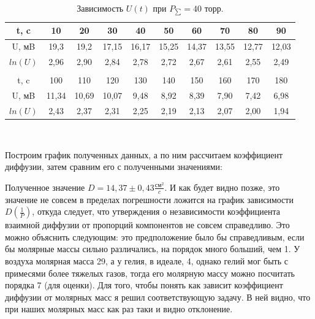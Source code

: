\documentclass[a4paper,11.5pt]{article} %
\begin{document}
\begin{table}[!h]
	\caption{Зависимость $U(t)$ при $P_{\sum} = 40 $ торр.}
\begin{tabular}{| c | c | c | c | c | c | c | c | c | c |}
\hline
t, c & 10 & 20 & 30 & 40 & 50 & 60 & 70 & 80 & 90  \\ \hline
U, мB & 19,3 & 19,2 & 17,15 & 16,17 & 15,25 & 14,37 & 13,55 & 12,77 & 12,03  \\ \hline
$ln(U)$ & 2,96 & 2,90 & 2,84 & 2,78 & 2,72 & 2,67 & 2,61 & 2,55 & 2,49  \\ \hline
\\  \hline
t, c & 100 & 110 & 120 & 130 & 140 & 150 & 160 & 170 & 180    \\ \hline
U, мB & 11,34 & 10,69 & 10,07 & 9,48 & 8,92 & 8,39 & 7,90 & 7,42 & 6,98  \\ \hline
$ln(U)$ & 2,43 & 2,37 & 2,31 & 2,25 & 2,19 & 2,13 & 2,07 & 2,00 & 1,94 \\ \hline
\end{tabular}\\
\end{table}

Построим график полученных данных, а по ним рассчитаем коэффициент диффузии, затем сравним его с полученными значениями:

\begin{figure}[!h]
\end{figure}

Полученное значение $D = 14,37 \pm 0,43 \frac{\text{см}^2}{c}.$ И как будет видно позже, это значение не совсем в пределах погрешности ложится на график зависимости $D(\frac{1}{P})$, откуда следует, что утверждения о независимости коэффициента взаимной диффузии от пропорций компонентов не совсем справедливо. Это можно объяснить следующим: это предположение было бы справедливым, если бы молярные массы сильно различались, на порядок много больший, чем 1. У воздуха молярная масса 29, а у гелия, в идеале, 4, однако гелий мог быть с примесями более тяжелых газов, тогда его молярную массу можно посчитать порядка 7 (для оценки). Для того, чтобы понять как зависит коэффициент диффузии от молярных масс я решил соответствующую задачу. В ней видно, что при наших молярных масс как раз таки и видно отклонение.
\end{document}
